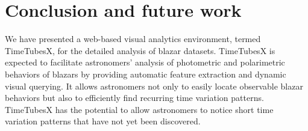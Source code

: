 \section{Conclusion and future work\label{sec:conclusion}}
We have presented a web-based visual analytics environment, termed TimeTubesX, for the detailed analysis of blazar datasets. %
TimeTubesX is expected to facilitate astronomers’ analysis of photometric and polarimetric behaviors of blazars 
by providing automatic feature extraction and dynamic visual querying.
It allows astronomers not only to easily locate observable blazar behaviors but also to efficiently find recurring time variation patterns.
TimeTubesX has the potential to allow astronomers to notice short time variation patterns that have not yet been discovered.


